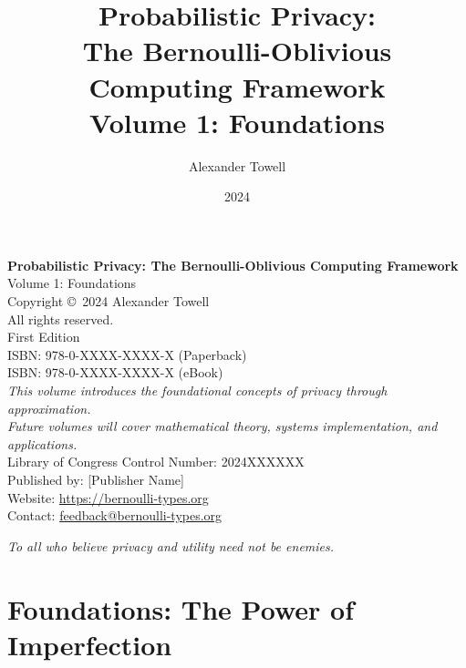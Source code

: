 \documentclass[11pt,oneside]{book}
\title{Probabilistic Privacy:\\
\Large The Bernoulli-Oblivious Computing Framework\\
\vspace{1cm}
\huge \textbf{Volume 1: Foundations}}
\author{Alexander Towell}
\date{2024}
\renewcommand{\thepage}{\roman{page}}
\begin{document}
\frontmatter
\maketitle

\thispagestyle{empty}
\vspace*{\fill}
\begin{center}
\textbf{Probabilistic Privacy: The Bernoulli-Oblivious Computing Framework}\\
Volume 1: Foundations\\
\vspace{0.5cm}
Copyright \copyright\ 2024 Alexander Towell\\
All rights reserved.\\
\vspace{0.5cm}
First Edition\\
\vspace{1cm}
ISBN: 978-0-XXXX-XXXX-X (Paperback)\\
ISBN: 978-0-XXXX-XXXX-X (eBook)\\
\vspace{0.5cm}
\textit{This volume introduces the foundational concepts of privacy through approximation.\\
Future volumes will cover mathematical theory, systems implementation, and applications.}\\
\vspace{1cm}
Library of Congress Control Number: 2024XXXXXX\\
\vspace{0.5cm}
Published by: [Publisher Name]\\
Website: \url{https://bernoulli-types.org}\\
Contact: \url{feedback@bernoulli-types.org}
\end{center}
\vspace*{\fill}
\clearpage

\thispagestyle{empty}
\vspace*{\fill}
\begin{center}
\textit{To all who believe privacy and utility need not be enemies.}
\end{center}
\vspace*{\fill}
\clearpage

\tableofcontents



\mainmatter
\renewcommand{\thepage}{\arabic{page}}
\setcounter{page}{1}

\part{Foundations: The Power of Imperfection}
\end{document}
